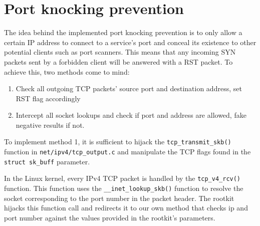\section{Port knocking prevention}
The idea behind the implemented port knocking prevention is to only allow a certain
IP address to connect to a service's port and conceal its existence to other potential clients such as port scanners. 
This means that any incoming SYN packets sent by a forbidden client will be answered with a RST packet. To achieve this,
two methods come to mind:
\begin{enumerate}
 \item Check all outgoing TCP packets' source port and destination address, set RST flag accordingly
 \item Intercept all socket lookups and check if port and address are allowed, fake negative results if not.
\end{enumerate}
To implement method 1, it is sufficient to hijack the 
\verb+tcp_transmit_skb()+ function in \verb+net/ipv4/tcp_output.c+ and manipulate the TCP flags found in the \verb+struct sk_buff+
parameter.


In the Linux kernel, every IPv4 TCP packet is handled by the \texttt{tcp\_v4\_rcv()} function. This 
function uses the \texttt{\_\_inet\_lookup\_skb()} function to resolve the socket 
corresponding to the port number in the packet header. The rootkit hijacks this function call and
redirects it to our own method that checks ip and port number against the values provided in the rootkit's parameters.
